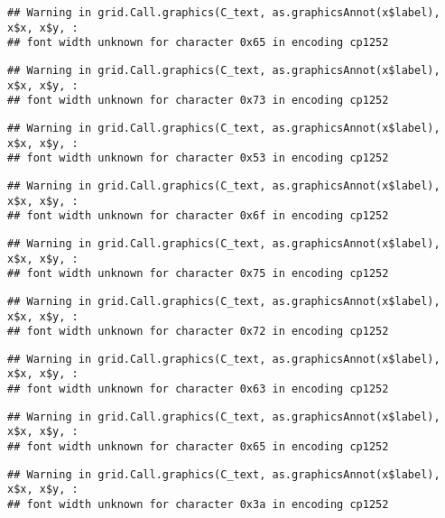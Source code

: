 \documentclass[
]{article}
\begin{document}
\begin{verbatim}
## Warning in grid.Call.graphics(C_text, as.graphicsAnnot(x$label), x$x, x$y, :
## font width unknown for character 0x65 in encoding cp1252
\end{verbatim}

\begin{verbatim}
## Warning in grid.Call.graphics(C_text, as.graphicsAnnot(x$label), x$x, x$y, :
## font width unknown for character 0x73 in encoding cp1252
\end{verbatim}

\begin{verbatim}
## Warning in grid.Call.graphics(C_text, as.graphicsAnnot(x$label), x$x, x$y, :
## font width unknown for character 0x53 in encoding cp1252
\end{verbatim}

\begin{verbatim}
## Warning in grid.Call.graphics(C_text, as.graphicsAnnot(x$label), x$x, x$y, :
## font width unknown for character 0x6f in encoding cp1252
\end{verbatim}

\begin{verbatim}
## Warning in grid.Call.graphics(C_text, as.graphicsAnnot(x$label), x$x, x$y, :
## font width unknown for character 0x75 in encoding cp1252
\end{verbatim}

\begin{verbatim}
## Warning in grid.Call.graphics(C_text, as.graphicsAnnot(x$label), x$x, x$y, :
## font width unknown for character 0x72 in encoding cp1252
\end{verbatim}

\begin{verbatim}
## Warning in grid.Call.graphics(C_text, as.graphicsAnnot(x$label), x$x, x$y, :
## font width unknown for character 0x63 in encoding cp1252
\end{verbatim}

\begin{verbatim}
## Warning in grid.Call.graphics(C_text, as.graphicsAnnot(x$label), x$x, x$y, :
## font width unknown for character 0x65 in encoding cp1252
\end{verbatim}

\begin{verbatim}
## Warning in grid.Call.graphics(C_text, as.graphicsAnnot(x$label), x$x, x$y, :
## font width unknown for character 0x3a in encoding cp1252
\end{verbatim}
\end{document}
